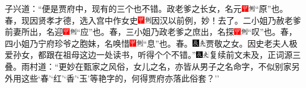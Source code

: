 子兴道：``便是贾府中，现有的三个也不错。政老爹之长女，名元{\includegraphics[width=3mm]{../Images/00002}\includegraphics[width=3mm]{../Images/00011}\footnotesize \kaishu ``原''也。}春，现因贤孝才德，选入宫中作女史{\includegraphics[width=3mm]{../Images/00002}\includegraphics[width=3mm]{../Images/00011}\footnotesize \kaishu 因汉以前例，妙！}去了。二小姐乃赦老爹前妻所出，名迎{\includegraphics[width=3mm]{../Images/00002}\includegraphics[width=3mm]{../Images/00011}\footnotesize \kaishu ``应''也。}春，三小姐乃政老爹之庶出，名探{\includegraphics[width=3mm]{../Images/00002}\includegraphics[width=3mm]{../Images/00011}\footnotesize \kaishu ``叹''也。}春，四小姐乃宁府珍爷之胞妹，名唤惜{\includegraphics[width=3mm]{../Images/00002}\includegraphics[width=3mm]{../Images/00011}\footnotesize \kaishu ``息''也。}春。{\includegraphics[width=3mm]{../Images/00009}\includegraphics[width=3mm]{../Images/00012}\footnotesize \kaishu 贾敬之女。}因史老夫人极爱孙女，都跟在祖母这边一处读书，听得个个不错。''{\includegraphics[width=3mm]{../Images/00009}\includegraphics[width=3mm]{../Images/00012}\footnotesize \kaishu 复续前文未及，正词源三叠。}雨村道：``更妙在甄家之风俗，女儿之名，亦皆从男子之名命字，不似别家另外用这些`春'`红'`香'`玉'等艳字的，何得贾府亦落此俗套？''

